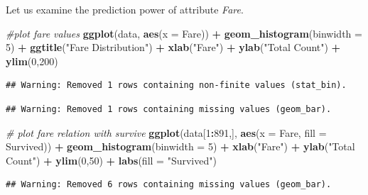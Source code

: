 \documentclass[
]{book}
\newenvironment{Shaded}{\begin{snugshade}}{\end{snugshade}}
\newcommand{\CommentTok}[1]{\textcolor[rgb]{0.56,0.35,0.01}{\textit{#1}}}
\newcommand{\DataTypeTok}[1]{\textcolor[rgb]{0.13,0.29,0.53}{#1}}
\newcommand{\DecValTok}[1]{\textcolor[rgb]{0.00,0.00,0.81}{#1}}
\newcommand{\KeywordTok}[1]{\textcolor[rgb]{0.13,0.29,0.53}{\textbf{#1}}}
\newcommand{\NormalTok}[1]{#1}
\newcommand{\OperatorTok}[1]{\textcolor[rgb]{0.81,0.36,0.00}{\textbf{#1}}}
\newcommand{\StringTok}[1]{\textcolor[rgb]{0.31,0.60,0.02}{#1}}
\begin{document}
Let us examine the prediction power of attribute \emph{Fare}.

\begin{Shaded}
\begin{Highlighting}[]
\CommentTok{#plot fare values}
\KeywordTok{ggplot}\NormalTok{(data, }\KeywordTok{aes}\NormalTok{(}\DataTypeTok{x =}\NormalTok{ Fare)) }\OperatorTok{+}
\StringTok{  }\KeywordTok{geom_histogram}\NormalTok{(}\DataTypeTok{binwidth =} \DecValTok{5}\NormalTok{) }\OperatorTok{+}
\StringTok{  }\KeywordTok{ggtitle}\NormalTok{(}\StringTok{"Fare Distribution"}\NormalTok{) }\OperatorTok{+}
\StringTok{  }\KeywordTok{xlab}\NormalTok{(}\StringTok{"Fare"}\NormalTok{) }\OperatorTok{+}
\StringTok{  }\KeywordTok{ylab}\NormalTok{(}\StringTok{"Total Count"}\NormalTok{) }\OperatorTok{+}
\StringTok{  }\KeywordTok{ylim}\NormalTok{(}\DecValTok{0}\NormalTok{,}\DecValTok{200}\NormalTok{)}
\end{Highlighting}
\end{Shaded}

\begin{verbatim}
## Warning: Removed 1 rows containing non-finite values (stat_bin).
\end{verbatim}

\begin{verbatim}
## Warning: Removed 1 rows containing missing values (geom_bar).
\end{verbatim}

\begin{Shaded}
\begin{Highlighting}[]
\CommentTok{# plot fare relation with survive}
\KeywordTok{ggplot}\NormalTok{(data[}\DecValTok{1}\OperatorTok{:}\DecValTok{891}\NormalTok{,], }\KeywordTok{aes}\NormalTok{(}\DataTypeTok{x =}\NormalTok{ Fare, }\DataTypeTok{fill =}\NormalTok{ Survived)) }\OperatorTok{+}
\StringTok{  }\KeywordTok{geom_histogram}\NormalTok{(}\DataTypeTok{binwidth =} \DecValTok{5}\NormalTok{) }\OperatorTok{+}
\StringTok{  }\KeywordTok{xlab}\NormalTok{(}\StringTok{"Fare"}\NormalTok{) }\OperatorTok{+}
\StringTok{  }\KeywordTok{ylab}\NormalTok{(}\StringTok{"Total Count"}\NormalTok{) }\OperatorTok{+}
\StringTok{  }\KeywordTok{ylim}\NormalTok{(}\DecValTok{0}\NormalTok{,}\DecValTok{50}\NormalTok{) }\OperatorTok{+}\StringTok{ }
\StringTok{  }\KeywordTok{labs}\NormalTok{(}\DataTypeTok{fill =} \StringTok{"Survived"}\NormalTok{)}
\end{Highlighting}
\end{Shaded}

\begin{verbatim}
## Warning: Removed 6 rows containing missing values (geom_bar).
\end{verbatim}
\end{document}
